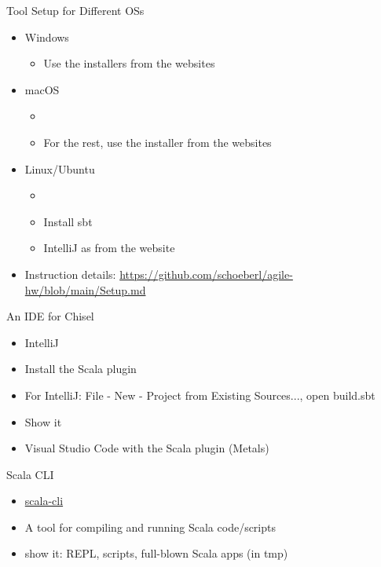 \begin{frame}[fragile]{Tool Setup for Different OSs}
\begin{itemize}
\item Windows
\begin{itemize}
\item Use the installers from the websites
\end{itemize}
\item macOS
\begin{itemize}
\item {}
\item For the rest, use the installer from the websites
\end{itemize}
\item Linux/Ubuntu
\begin{itemize}
\item {}
\item Install sbt
\item IntelliJ as from the website
\end{itemize}
\item Instruction details: \url{https://github.com/schoeberl/agile-hw/blob/main/Setup.md}
\end{itemize}
\end{frame}


\begin{frame}[fragile]{An IDE for Chisel}
\begin{itemize}
\item IntelliJ
\item Install the Scala plugin
\item For IntelliJ: File - New - Project from Existing Sources..., open build.sbt
\item Show it %
\item Visual Studio Code with the Scala plugin (Metals)
\end{itemize}
\end{frame}


\begin{frame}[fragile]{Scala CLI}
\begin{itemize}
\item \href{https://scala-cli.virtuslab.org/}{scala-cli}
\item A tool for compiling and running Scala code/scripts
\item show it: REPL, scripts, full-blown Scala apps (in tmp)
\end{itemize}
\end{frame}


